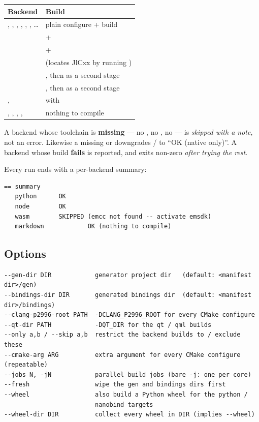 \begin{center}
\small
\begin{tabular}{@{}L{6.6cm}L{6.4cm}@{}}
\toprule
\textbf{Backend} & \textbf{Build} \\
\midrule
{}, , , , ,
  , \ldots & plain  configure + build \\
   &  +  \\
   &  +  \\
  &  (locates JlCxx by running ) \\
 & , then  as a second stage \\
   & , then  as a second stage \\
,  &  with  \\
, , , ,
   & nothing to compile \\
\bottomrule
\end{tabular}
\end{center}

A backend whose toolchain is \textbf{missing} --- no , no
, no  --- is \emph{skipped with a note}, not an error.
Likewise a missing  or  downgrades  /
 to ``OK (native only)''. A backend whose build \textbf{fails} is
reported, and  exits non-zero \emph{after trying the rest}.

Every run ends with a per-backend summary:

\begin{lstlisting}[style=plain]
== summary
   python      OK
   node        OK
   wasm        SKIPPED (emcc not found -- activate emsdk)
   markdown            OK (nothing to compile)
\end{lstlisting}

\subsection{Options}

\begin{lstlisting}[style=plain]
--gen-dir DIR            generator project dir   (default: <manifest dir>/gen)
--bindings-dir DIR       generated bindings dir  (default: <manifest dir>/bindings)
--clang-p2996-root PATH  -DCLANG_P2996_ROOT for every CMake configure
--qt-dir PATH            -DQT_DIR for the qt / qml builds
--only a,b / --skip a,b  restrict the backend builds to / exclude these
--cmake-arg ARG          extra argument for every CMake configure (repeatable)
--jobs N, -jN            parallel build jobs (bare -j: one per core)
--fresh                  wipe the gen and bindings dirs first
--wheel                  also build a Python wheel for the python /
                         nanobind targets
--wheel-dir DIR          collect every wheel in DIR (implies --wheel)
\end{lstlisting}

